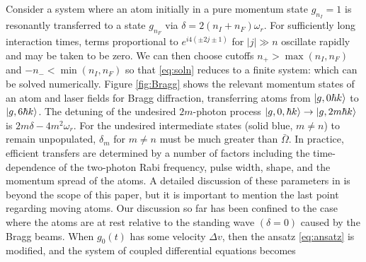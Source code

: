 \documentclass[reprint,
nofootinbib,
amsmath,amssymb,
aps]{revtex4-1}
\newcommand{\f}[2]{\frac{#1}{#2}}
\newcommand{\lb}{\left[}
\newcommand{\rb}{\right]}
\begin{document}
Consider a system where an atom initially in a pure momentum state $g_{n_I} = 1$ is resonantly transferred to a state $g_{n_F}$ via $\delta = 2(n_I + n_F)\omega_r$. For sufficiently long interaction times, terms proportional to $e^{i4(\pm 2j \pm  1)}$ for $|j|\gg n$ oscillate rapidly and may be taken to be zero. We can then choose cutoffs $n_+ > \max(n_I, n_F)$ and $-n_- < \min(n_I, n_F)$ so that \eqref{eq:soln} reduces to a  finite system:
which can be solved numerically. Figure \ref{fig:Bragg} shows the relevant momentum states of an atom and laser fields for Bragg diffraction, transferring atoms from $\ket{g,0\hbar k}$ to $\ket{g,6\hbar k}$. The detuning of the undesired $2m$-photon process $\ket{g,0,\hbar k} \to \ket{g,2m\hbar k}$ is $2m\delta - 4m^2 \omega_r$. For the undesired intermediate states (solid blue, $m\neq n$) to remain unpopulated, $\delta_m$ for $m\neq n$ must be much greater than $\bar{\Omega}$. In practice, efficient transfers are determined by a number of factors including the time-dependence of the two-photon Rabi frequency, pulse width, shape, and the momentum spread of the atoms. A detailed discussion of these parameters in \cite{estey2016precision} is beyond the scope of this paper, but it is important to mention the last point regarding moving atoms. Our discussion so far has been confined to the case where the atoms are at rest relative to the standing wave $(\delta = 0)$ caused by the Bragg beams. When $g_0(t)$ has some velocity $\Delta v$, then the ansatz \eqref{eq:ansatz} is modified, and the system of coupled differential equations becomes
\end{document}
